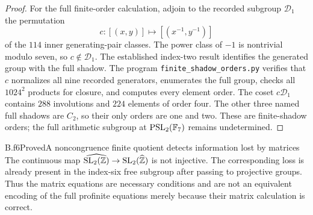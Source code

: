 \begin{proof}
For the full finite-order calculation, adjoin to the recorded subgroup
$\mathcal D_1$ the permutation
\[
 c:[(x,y)]\longmapsto[(x^{-1},y^{-1})]
\]
of the $114$ inner generating-pair classes. The power class of $-1$
is nontrivial modulo seven, so $c\notin\mathcal D_1$. The established
index-two result identifies the generated group with the full shadow.
The program \nolinkurl{finite_shadow_orders.py} verifies that $c$
normalizes all nine recorded generators, enumerates the full group,
checks all $1024^2$ products for closure, and computes every element
order. The coset $c\mathcal D_1$ contains $288$ involutions and $224$
elements of order four. The other three named full shadows are $C_2$,
so their only orders are one and two. These are finite-shadow orders;
the full arithmetic subgroup at $\operatorname{PSL}_2(\mathbb F_7)$ remains undetermined.
\end{proof}



\begin{claim}{B.f6}{Proved}{A noncongruence finite quotient detects information lost by matrices}
The continuous map
$\widehat{\operatorname{SL}_2(\mathbb Z)}\to\operatorname{SL}_2(\widehat{\mathbb Z})$ is not injective.
The corresponding loss is already present in the index-six free
subgroup after passing to projective groups. Thus the matrix equations
are necessary conditions and are not an equivalent encoding of the
full profinite equations merely because their matrix calculation is correct.
\end{claim}

